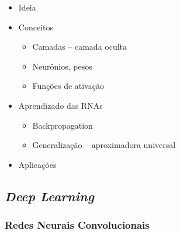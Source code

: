 \begin{itemize}
	\item Ideia
	\item Conceitos
	\begin{itemize}
		\item Camadas -- camada oculta
		\item Neurônios, pesos
		\item Funções de ativação
	\end{itemize}
	\item Aprendizado das RNAs
	\begin{itemize}
		\item Backpropagation
		\item Generalização -- aproximadora universal
	\end{itemize}
	\item Aplicações
\end{itemize}
\subsection{\textit{Deep Learning}}
\subsubsection{Redes Neurais Convolucionais}